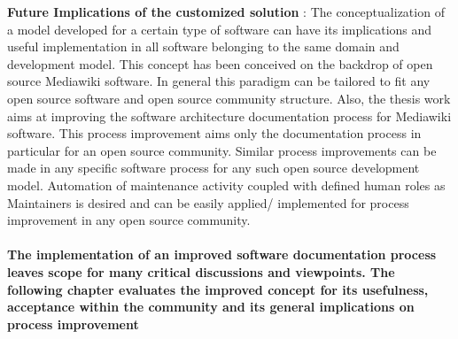 \textbf{Future Implications of the customized solution} : 
\newline The conceptualization of a model developed for a certain type of software can have its implications and useful implementation in all software belonging to the same domain and development model.
\newline This concept has been conceived on the backdrop of open source Mediawiki software. In general this paradigm can be tailored to fit any open source software and open source community structure. Also, the thesis work aims at improving the software architecture documentation process for Mediawiki software. 
\newline This process improvement aims only the documentation process in particular for an open source community. Similar process improvements can be made in any specific software process for any such open source development model. Automation of maintenance activity coupled with defined human roles as Maintainers is desired and can be easily applied/ implemented for process improvement in any open source community.

\paragraph{The implementation of an improved software documentation process leaves scope for many critical discussions and viewpoints. The following chapter evaluates the improved concept for its usefulness, acceptance within the community and its general implications on process improvement}